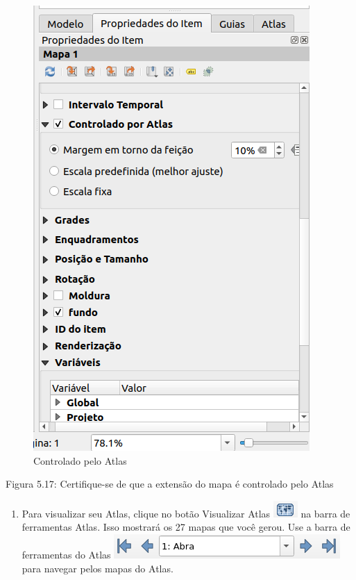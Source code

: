 \documentclass[
]{krantz}
\providecommand{\tightlist}{%
  \setlength{\itemsep}{0pt}\setlength{\parskip}{0pt}}
\begin{document}
\begin{figure}
\centering
\includegraphics{media/modulo5/atlas-controlled.png}
\caption{Controlado pelo Atlas}
\end{figure}

Figura 5.17: Certifique-se de que a extensão do mapa é controlado pelo Atlas

\begin{enumerate}
\def\labelenumi{\arabic{enumi}.}
\setcounter{enumi}{4}
\tightlist
\item
  Para visualizar seu Atlas, clique no botão Visualizar Atlas \includegraphics{media/modulo5/atlas-preview-btn.png} na barra de ferramentas Atlas. Isso mostrará os 27 mapas que você gerou. Use a barra de ferramentas do Atlas \includegraphics{media/modulo5/atlas-toolbar-nav.png} para navegar pelos mapas do Atlas.
\end{enumerate}
\end{document}
